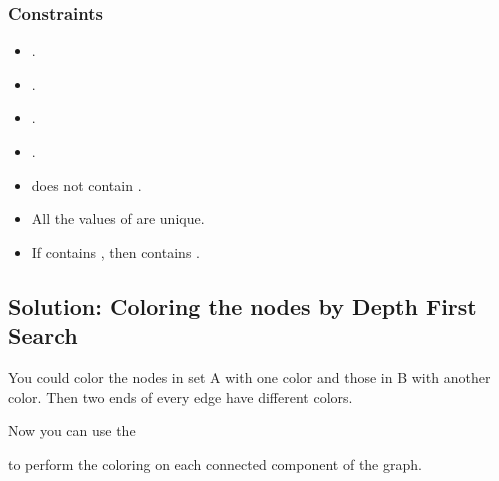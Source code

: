 \documentclass[letterpaper,12pt,english]{book}
\begin{document}
\subsubsection{Constraints}
\label{\detokenize{Graph/785_Is_Graph_Bipartite:constraints}}\begin{itemize}
\item {} 
\sphinxAtStartPar
{}.

\item {} 
\sphinxAtStartPar
{}.

\item {} 
\sphinxAtStartPar
{}.

\item {} 
\sphinxAtStartPar
{}.

\item {} 
\sphinxAtStartPar
{} does not contain .

\item {} 
\sphinxAtStartPar
All the values of  are unique.

\item {} 
\sphinxAtStartPar
If  contains , then  contains .

\end{itemize}


\subsection{Solution: Coloring the nodes by Depth First Search}
\label{\detokenize{Graph/785_Is_Graph_Bipartite:solution-coloring-the-nodes-by-depth-first-search}}
\sphinxAtStartPar
You could color the nodes in set A with one color and those in B with another color. Then two ends of every edge have different colors.

\sphinxAtStartPar
Now you can use the %
\begin{footnote}[70]\sphinxAtStartFootnote
{}
%
\end{footnote} to perform the coloring on each connected component of the graph.
\end{document}
